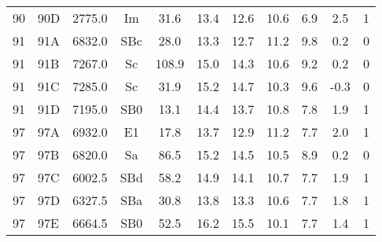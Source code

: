 \begin{table*}[]
\begin{center}
\begin{tabular}{clccccccccc}
 90 & 90D & 2775.0 & Im & 31.6 & 13.4 & 12.6 & 10.6 & 6.9 & 2.5 & 1 \\ 
 91 & 91A & 6832.0 & SBc & 28.0 & 13.3 & 12.7 & 11.2 & 9.8 & 0.2 & 0 \\ 
 91 & 91B & 7267.0 & Sc & 108.9 & 15.0 & 14.3 & 10.6 & 9.2 & 0.2 & 0 \\ 
 91 & 91C & 7285.0 & Sc & 31.9 & 15.2 & 14.7 & 10.3 & 9.6 & -0.3 & 0 \\ 
 91 & 91D & 7195.0 & SB0 & 13.1 & 14.4 & 13.7 & 10.8 & 7.8 & 1.9 & 1 \\ 
 97 & 97A & 6932.0 & E1 & 17.8 & 13.7 & 12.9 & 11.2 & 7.7 & 2.0 & 1 \\ 
 97 & 97B & 6820.0 & Sa & 86.5 & 15.2 & 14.5 & 10.5 & 8.9 & 0.2 & 0 \\ 
 97 & 97C & 6002.5 & SBd & 58.2 & 14.9 & 14.1 & 10.7 & 7.7 & 1.9 & 1 \\ 
 97 & 97D & 6327.5 & SBa & 30.8 & 13.8 & 13.3 & 10.6 & 7.7 & 1.8 & 1 \\ 
 97 & 97E & 6664.5 & SB0 & 52.5 & 16.2 & 15.5 & 10.1 & 7.7 & 1.4 & 1 \\ 
 \hline
\end{tabular}
        \end{center}
        \end{table*}